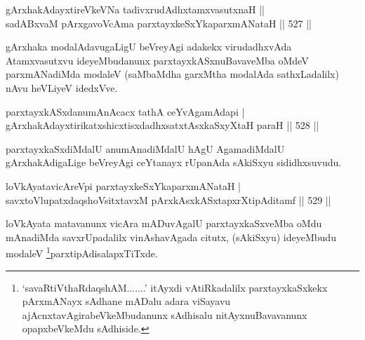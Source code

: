 \begin{shl}
gArxhakAdayxtireVkeVNa tadivxrudAdhxtamxvasutxnaH ||  \\
sadABxvaM pArxgavoVcAma parxtayxkeSxYkaparxmANataH \hfill||  527 ||  
\end{shl}

\begin{artha}
gArxhaka modalAdavugaLigU beVreyAgi adakekx virudadhxvAda Atamxvasutxvu ideyeMbudanunx parxtayxkASxnuBavaveMba oMdeV parxmANadiMda modaleV (saMbaMdha garxMtha modalAda sathxLadalilx) nAvu heVLiyeV idedxVve.
\end{artha}


\begin{shl}
parxtayxkASx\footnotemark[1]danumAnAcacx tathA ceYvA\s \s gamAdapi | \\
gArxhakAdayxtirikatxshicxtisxdadhxsatxtAsxkaSxyXtaH paraH \hfill||  528 ||  
\end{shl}

\begin{artha}
parxtayxkaSxdiMdalU anumAnadiMdalU hAgU AgamadiMdalU gArxhakAdigaLige beVreyAgi ceYtanayx rUpanAda sAkiSxyu sididhxsuvudu.
\end{artha}


\begin{shl}
loVkAyatavicAreV\s pi parxtayxkeSxYkaparxmANataH | \\
savxtoV\s lupatxdaqshoV\s sitxtavxM pArxkAsxkASxtapxrXtipAditamf \hfill||  529 ||  
\end{shl}

\begin{artha}
loVkAyata matavanunx vicAra mADuvAgalU parxtayxkaSxveMba oMdu mAnadiMda savxrUpadalilx vinAshavAgada citutx, (sAkiSxyu) ideyeMbudu modaleV \footnote{`savaRtiVthaRdaqshAM.......' itAyxdi vAtiRkadalilx parxtayxkaSxkekx pArxmANayx sAdhane mADalu adara viSayavu ajAcnxtavAgirabeVkeMbudanunx sAdhisalu nitAyxnuBavavanunx opapxbeVkeMdu sAdhiside.}parxtipAdisalapxTiTxde.
\end{artha}


